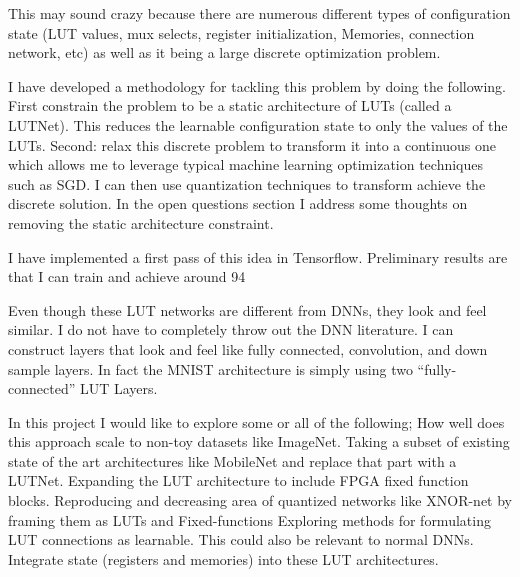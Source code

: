 \documentclass{vgtc}                          %
\begin{document}
This may sound crazy because there are numerous different types of configuration state (LUT values, mux selects, register initialization, Memories, connection network, etc) as well as it being a large discrete optimization problem.

I have developed a methodology for tackling this problem by doing the following. First constrain the problem to be a static architecture of LUTs (called a LUTNet). This reduces the learnable configuration state to only the values of the LUTs. Second: relax this discrete problem to transform it into a continuous one which allows me to leverage typical machine learning optimization techniques such as SGD. I can then use quantization techniques to transform achieve the discrete solution. In the open questions section I address some thoughts on removing the static architecture constraint.

I have implemented a first pass of this idea in Tensorflow. Preliminary results are that I can train and achieve around 94%

Even though these LUT networks are different from DNNs, they look and feel similar. I do not have to completely throw out the DNN literature. I can construct layers that look and feel like fully connected, convolution, and down sample layers.  In fact the MNIST architecture is simply using two “fully-connected” LUT Layers.

In this project I would like to explore some or all of the following;
How well does this approach scale to non-toy datasets like ImageNet.
Taking a subset of existing state of the art architectures like MobileNet and replace that part with a LUTNet.
Expanding the LUT architecture to include FPGA fixed function blocks.
Reproducing and decreasing area of quantized networks like XNOR-net by framing them as LUTs and Fixed-functions
Exploring methods for formulating LUT connections as learnable. This could also be relevant to normal DNNs. 
Integrate state (registers and memories) into these LUT architectures.
\maketitle
\end{document}
